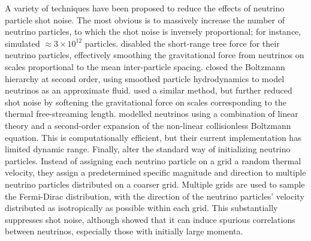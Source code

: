 \documentclass[useAMS, usenatbib]{mnras}
\begin{document}
A variety of techniques have been proposed to reduce the effects of neutrino particle shot noise.
The most obvious is to massively increase the number of neutrino particles, to which the shot noise is inversely proportional; for instance, \cite{Emberson_17} simulated $\approx 3\times 10^{12}$ particles.
\cite{Viel_2010} disabled the short-range tree force for their neutrino particles, effectively smoothing the gravitational force from neutrinos on scales proportional to the mean inter-particle spacing. \cite{Hannestad_2012} closed the Boltzmann hierarchy at second order, using smoothed particle hydrodynamics to model neutrinos as an approximate fluid. \cite{Banerjee_2016} used a similar method, but further reduced shot noise by softening the gravitational force on scales corresponding to the thermal free-streaming length. \cite{Dakin:2017} modelled neutrinos using a combination of linear theory and a second-order expansion of the non-linear collisionless Boltzmann equation. This is computationally efficient, but their current implementation has limited dynamic range. Finally, \cite{Banerjee_2018} alter the standard way of initializing neutrino particles. Instead of assigning each neutrino particle on a grid a random thermal velocity, they assign a predetermined specific magnitude and direction to multiple neutrino particles distributed on a coarser grid. Multiple grids are used to sample the Fermi-Dirac distribution, with the direction of the neutrino particles' velocity distributed as isotropically as possible within each grid. This substantially suppresses shot noise, although \cite{Brandbyge:2018} showed that it can induce spurious correlations between neutrinos, especially those with initially large momenta.

\end{document}
